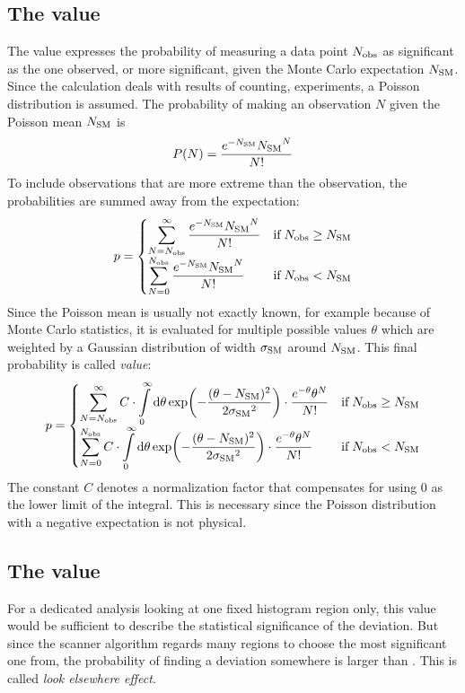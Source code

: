 \subsection{The \p value}
The \p value expresses the probability of measuring a data point ${N_\mathrm{obs}}$ as significant as the one observed, or more significant, given the Monte Carlo expectation ${N_\mathrm{SM}}$.
Since the calculation deals with results of counting, experiments, a Poisson distribution is assumed. The probability of making an observation $N$ given the Poisson mean ${N_\mathrm{SM}}$ is
\begin{equation}
	P(N) = \frac{e^{-{N_\mathrm{SM}}} {N_\mathrm{SM}}^N}{N!}
\end{equation}
To include observations that are more extreme than the observation, the probabilities are summed away from the expectation:
\begin{equation}
p = 
	\begin{cases} 
		\displaystyle
		\sum\limits_{N = {N_\mathrm{obs}}}^{\infty} \frac{e^{-{N_\mathrm{SM}}} {N_\mathrm{SM}}^N}{N!} &\mbox{if} \; {N_\mathrm{obs}} \geq {N_\mathrm{SM}} \\
		\displaystyle
		\sum\limits_{N = 0}^{{N_\mathrm{obs}}} \frac{e^{-{N_\mathrm{SM}}} {N_\mathrm{SM}}^N}{N!} &\mbox{if} \; {N_\mathrm{obs}} < {N_\mathrm{SM}}
	\end{cases}
\end{equation}
Since the Poisson mean is usually not exactly known, for example because of Monte Carlo statistics, it is evaluated for multiple possible values $\theta$ which are weighted by a Gaussian distribution of width ${\sigma_\mathrm{SM}}$ around ${N_\mathrm{SM}}$. This final probability is called \emph{\p value}:
\begin{equation}
p = 
	\begin{cases} 
		\displaystyle
		\sum\limits_{N = {N_\mathrm{obs}}}^{\infty} C \cdot \int\limits_0^\infty \dd \theta \exp(-\frac{(\theta-{N_\mathrm{SM}})^2}{2 {\sigma_\mathrm{SM}}^2}) \cdot \frac{e^{-\theta} \theta^N}{N!} &\mbox{if} \; {N_\mathrm{obs}} \geq {N_\mathrm{SM}} \\
		\displaystyle
		\sum\limits_{N = 0}^{{N_\mathrm{obs}}} C \cdot \int\limits_0^\infty \dd \theta \exp(-\frac{(\theta-{N_\mathrm{SM}})^2}{2 {\sigma_\mathrm{SM}}^2}) \cdot \frac{e^{-\theta} \theta^N}{N!} &\mbox{if} \; {N_\mathrm{obs}} < {N_\mathrm{SM}}
	\end{cases}
\end{equation}
The constant $C$ denotes a normalization factor that compensates for using $0$ as the lower limit of the integral. This is necessary since the Poisson distribution with a negative expectation is not physical.

\subsection{The \ptilde value}
For a dedicated analysis looking at one fixed histogram region only, this \p value would be sufficient to describe the statistical significance of the deviation. But since the scanner algorithm regards many regions to choose the most significant one from, the probability of finding a deviation somewhere is larger than \p. This is called \emph{look elsewhere effect}.

